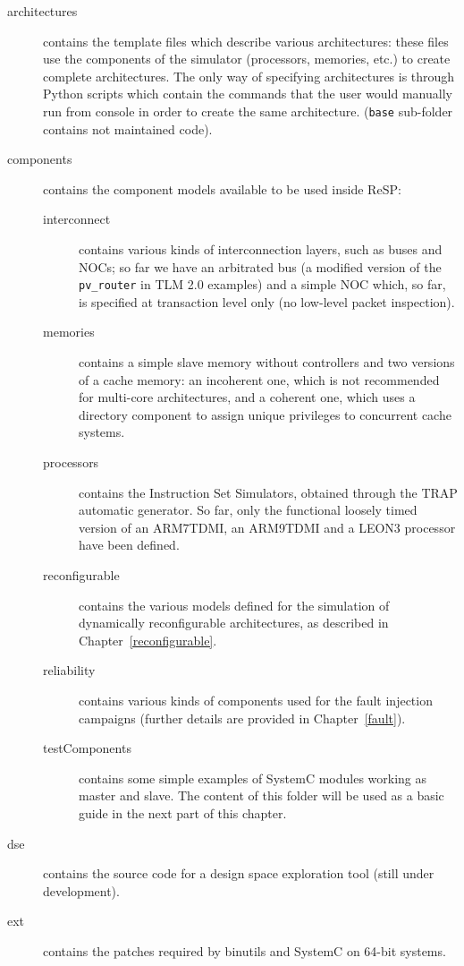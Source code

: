 \begin{description}
  \item[architectures] contains the template files which describe various architectures: these files use the components of the simulator (processors, memories, etc.) to create complete architectures. The only way of specifying architectures is through Python scripts which contain the commands that the user would manually run from console in order to create the same architecture. (\texttt{base} sub-folder contains not maintained code).
  \item[components] contains the component models available to be used inside ReSP:
  \begin{description}
    \item[interconnect] contains various kinds of interconnection layers, such as buses and NOCs; so far we have an arbitrated bus (a modified version of the \texttt{pv\_router} in TLM 2.0 examples) and a simple NOC which, so far, is specified at transaction level only (no low-level packet inspection).
    \item[memories] contains a simple slave memory without controllers and two versions of a cache memory: an incoherent one, which is not recommended for multi-core architectures, and a coherent one, which uses a directory component to assign unique privileges to concurrent cache systems.
    \item[processors] contains the Instruction Set Simulators, obtained through the TRAP automatic generator. So far, only the functional loosely timed version of an ARM7TDMI, an ARM9TDMI and a LEON3 processor have been defined.
    \item[reconfigurable] contains the various models defined for the simulation of dynamically reconfigurable architectures, as described in Chapter~\ref{reconfigurable}.
    \item[reliability] contains various kinds of components used for the fault injection campaigns (further details are provided in Chapter~\ref{fault}).
    \item[testComponents] contains some simple examples of SystemC modules working as master and slave. The content of this folder will be used as a basic guide in the next part of this chapter.
  \end{description}
  \item[dse] contains the source code for a design space exploration tool (still under development).
  \item[ext] contains the patches required by binutils and SystemC on 64-bit systems.

\end{description}
